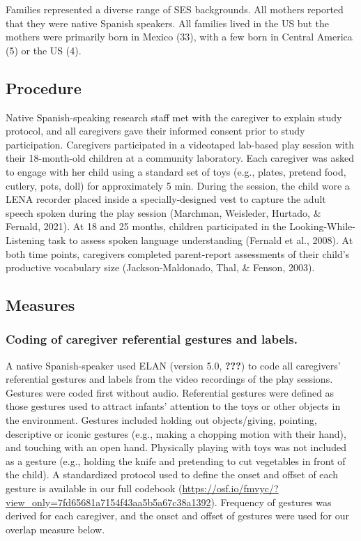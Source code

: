 \documentclass[
  english,
  man,mask]{apa6}
\begin{document}
Families represented a diverse range of SES backgrounds. All mothers reported that they were native Spanish speakers. All families lived in the US but the mothers were primarily born in Mexico (33), with a few born in Central America (5) or the US (4).

\hypertarget{procedure}{%
\subsection{Procedure}\label{procedure}}

Native Spanish-speaking research staff met with the caregiver to explain study protocol, and all caregivers gave their informed consent prior to study participation. Caregivers participated in a videotaped lab-based play session with their 18-month-old children at a community laboratory. Each caregiver was asked to engage with her child using a standard set of toys (e.g., plates, pretend food, cutlery, pots, doll) for approximately 5 min. During the session, the child wore a LENA recorder placed inside a specially-designed vest to capture the adult speech spoken during the play session (Marchman, Weisleder, Hurtado, \& Fernald, 2021). At 18 and 25 months, children participated in the Looking-While-Listening task to assess spoken language understanding (Fernald et al., 2008). At both time points, caregivers completed parent-report assessments of their child's productive vocabulary size (Jackson-Maldonado, Thal, \& Fenson, 2003).

\hypertarget{measures}{%
\subsection{Measures}\label{measures}}

\hypertarget{coding-of-caregiver-referential-gestures-and-labels.}{%
\subsubsection{Coding of caregiver referential gestures and labels.}\label{coding-of-caregiver-referential-gestures-and-labels.}}

A native Spanish-speaker used ELAN (version 5.0, {\textbf{???}}) to code all caregivers' referential gestures and labels from the video recordings of the play sessions. Gestures were coded first without audio. Referential gestures were defined as those gestures used to attract infants' attention to the toys or other objects in the environment. Gestures included holding out objects/giving, pointing, descriptive or iconic gestures (e.g., making a chopping motion with their hand), and touching with an open hand. Physically playing with toys was not included as a gesture (e.g., holding the knife and pretending to cut vegetables in front of the child). A standardized protocol used to define the onset and offset of each gesture is available in our full codebook (\url{https://osf.io/fmvyc/?view_only=7fd65681a7154f43aa5b5a67c38a1392}). Frequency of gestures was derived for each caregiver, and the onset and offset of gestures were used for our overlap measure below.
\end{document}
